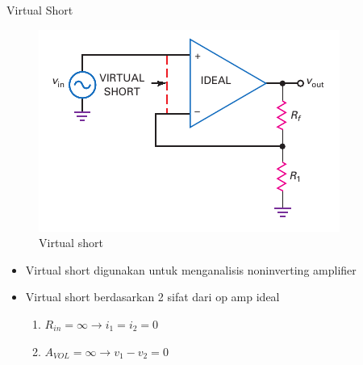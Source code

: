 \begin{frame}{Virtual Short}
	\begin{multicols}{2}
		\begin{figure}
			\centering
			\includegraphics[width=\linewidth]{gambar/fig-16.19}
			\caption{Virtual short}
			\label{fig-16.19}
		\end{figure}
	\columnbreak
		\begin{itemize}
			\item Virtual short digunakan untuk menganalisis noninverting amplifier
			\item Virtual short berdasarkan 2 sifat dari op amp ideal
			\begin{enumerate}
				\item $ R_{in} = \infty \rightarrow i_1 = i_2 = 0$
				\item $ A_{VOL} = \infty \rightarrow v_1 - v_2 = 0$
			\end{enumerate}
		\end{itemize}
	\end{multicols}
\end{frame}


